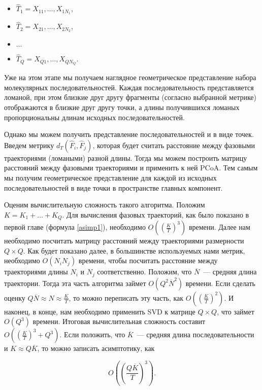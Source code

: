 \begin{itemize}
  \item $\hat{T}_1 = X_{11},\ldots,X_{1 N_1}$,
  \item $\hat{T}_2 = X_{21},\ldots,X_{2 N_2}$,
  \item $\ldots$
  \item $\hat{T}_Q = X_{Q1},\ldots,X_{Q N_Q}$.
\end{itemize}

Уже на этом этапе мы получаем наглядное геометрическое представление набора молекулярных последовательностей. Каждая последовательность представляется ломаной, при этом близкие друг другу фрагменты (согласно выбранной метрике) отображаются в близкие друг другу точки, а длины получившихся ломаных пропорциональны длинам исходных последовательностей.

Однако мы можем получить представление последовательностей и в виде точек. Введем метрику $d_T(\hat{F}_i, \hat{F}_j)$, которая будет считать расстояние между фазовыми траекториями (ломаными) разной длины. Тогда мы можем построить матрицу расстояний между фазовыми траекториями и применить к ней PCoA. Тем самым мы получим геометрическое представление для каждой из исходных последовательностей в виде точки в пространстве главных компонент.

Оценим вычислительную сложность такого алгоритма. Положим $K = K_1 +\ldots + K_Q$. Для вычисления фазовых траекторий, как было показано в первой главе (формула \ref{asimp1}), необходимо $O\left(\left(\frac{K}{T}\right)^3\right)$ времени. Далее нам необходимо посчитать матрицу расстояний между траекториями размерности $Q\times Q$. Как будет показано далее, в большинстве используемых нами метрик, необходимо $O(N_i N_j)$ времени, чтобы посчитать расстояние между траекториями длины $N_i$ и $N_j$ соответственно. Положим, что $\overline{N}$~--- средняя длина траектории. Тогда эта часть алгоритма займет $O(Q^2\overline{N}^2)$ времени. Если сделать оценку $Q\overline{N} \approx N \approx \frac{K}{T}$, то можно переписать эту часть, как $O\left(\left(\frac{K}{T}\right)^2\right)$. И наконец, в конце, нам необходимо применить SVD к матрице $Q\times Q$, что займет $O(Q^3)$ времени. Итоговая вычислительная сложность составит $O\left(\left(\frac{K}{T}\right)^3 + Q^3\right)$. Если положить, что $\overline{K}$~--- средняя длина последовательности и $K \approx Q\overline{K}$, то можно записать асимптотику, как

\begin{equation}
  O\left(\left(\frac{Q\overline{K}}{T}\right)^3\right).
  \label{asimp2}
\end{equation}

